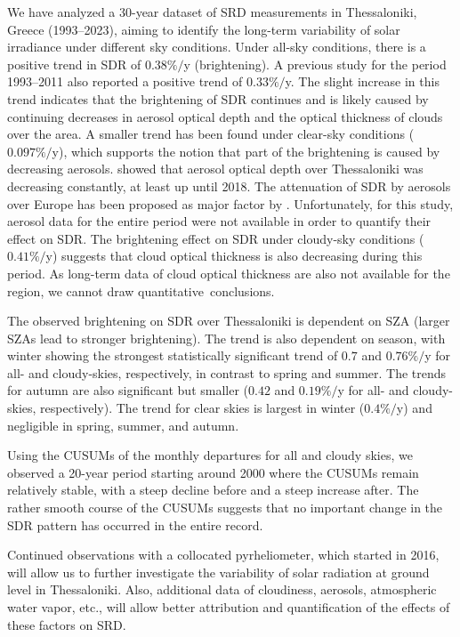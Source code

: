 \documentclass[applsci,article,accept,moreauthors,pdftex]{Definitions/mdpi}
\begin{document}
We have analyzed a 30-year dataset of SRD measurements in Thessaloniki,
Greece (1993--2023), aiming to identify the long-term variability of
solar irradiance under different sky conditions. Under all-sky
conditions, there is a positive trend in SDR of \(0.38\%/\)y
(brightening). A previous study \citep{Bais2013} for the period 1993--2011 also reported a positive trend of \(0.33\%/\)y. The slight
increase in this trend indicates that the brightening of SDR continues
and is likely caused by continuing decreases in aerosol optical depth
and the optical thickness of clouds over the area. A smaller trend has
been found under clear-sky conditions (\(0.097\%/\)y), which supports
the notion that part of the brightening is caused by decreasing
aerosols. \citet{Siomos2020} showed that aerosol optical depth over
Thessaloniki was decreasing constantly, at least up until 2018. The
attenuation of SDR by aerosols over Europe has been proposed as major
factor by \citet{Wild2021}. Unfortunately, for this study, aerosol data
for the entire period were not available in order to quantify their
effect on SDR. The brightening effect on SDR under cloudy-sky conditions
(\(0.41\%/\)y) suggests that cloud optical thickness is also
decreasing during this period. As long-term data of cloud optical
thickness are also not available for the region, we cannot draw
quantitative~conclusions.

The observed brightening on SDR over Thessaloniki is dependent on SZA
(larger SZAs lead to stronger brightening). The trend is also dependent
on season, with winter showing the strongest statistically significant
trend of \(0.7\) and \(0.76\%/\)y for all- and cloudy-skies,
respectively, in contrast to spring and summer. The trends for autumn
are also significant but smaller (\(0.42\) and \(0.19\%/\)y for all-
and cloudy-skies, respectively). The trend for clear skies is largest in
winter (\(0.4\%/\)y) and negligible in spring, summer, and autumn.

Using the CUSUMs of the monthly departures for all and cloudy skies, we
observed a 20-year period starting around 2000 where the CUSUMs remain
relatively stable, with a steep decline before and a steep increase
after. The rather smooth course of the CUSUMs suggests that no important
change in the SDR pattern has occurred in the entire record.

Continued observations with a collocated pyrheliometer, which started in
2016, will allow us to further investigate the variability of solar
radiation at ground level in Thessaloniki. Also, additional data of
cloudiness, aerosols, atmospheric water vapor, etc., will allow better
attribution and quantification of the effects of these factors on SRD.
\end{document}
